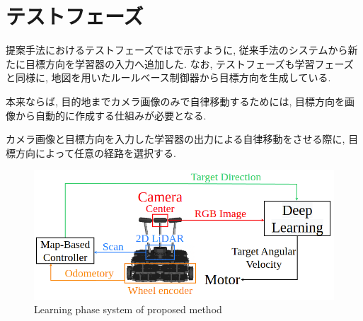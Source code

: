 
\section{テストフェーズ}
提案手法におけるテストフェーズではで示すように, 従来手法のシステムから新たに目標方向を学習器の入力へ追加した. なお, テストフェーズも学習フェーズと同様に, 地図を用いたルールベース制御器から目標方向を生成している. 
\par
本来ならば, 目的地までカメラ画像のみで自律移動するためには, 目標方向を画像から自動的に作成する仕組みが必要となる. 


\par
カメラ画像と目標方向を入力した学習器の出力による自律移動をさせる際に, 目標方向によって任意の経路を選択する.

\vspace{1cm}

\begin{figure}[hbtp]
  \centering
 \includegraphics[keepaspectratio, scale=0.46]
      {images/suggest_test_phase.png}
 \caption{Learning phase system of proposed method}
 \label{Fig:suggest_test_phase}
\end{figure}

\newpage
